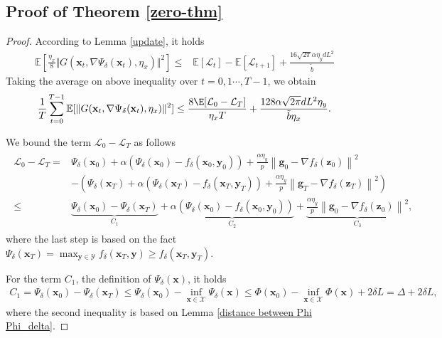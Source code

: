 \documentclass[11pt]{article}
\def\vx{\mathbf{x}}
\def\vy{\mathbf{y}}
\def\fX{{\mathcal{X}}}
\def\BE{{\mathbb{E}}}
\newcommand{\norm}[1]{\left\| #1 \right\|}
\begin{document}
\subsection{Proof of Theorem \ref{zero-thm}}
\begin{proof}
According to Lemma \ref{update}, it holds
\begin{align*}
\BE \left[ \frac{\eta_x}{8} \Vert G(\vx_t,\nabla\Psi_\delta(\vx_t),\eta_x)  \Vert^2   \right]
\le & \BE \left[ \mathcal{L}_t \right]-\BE[\mathcal{L}_{t+1}]  +  \frac{16\sqrt{2\pi }\alpha \eta_y dL^{2}}{\tilde{b}}
\end{align*}  
Taking the average on above inequality over $t = 0,1\cdots,T-1$, we obtain
\begin{align} \label{ieq:res-bound}
\frac{1}{T} \sum_{t=0}^{T-1} \BE[\Vert G(\vx_t,\nabla\Psi_\delta(\vx_t),\eta_x)  \Vert^2] \leq \frac{8\E[\mathcal{L}_0-\mathcal{L}_T] }{\eta_x T}  +
  \frac{128\alpha\sqrt{2\pi }dL^{2}\eta_y}{\tilde{b}\eta_x}.
\end{align}

We bound the term $\mathcal{L}_0-\mathcal{L}_T$ as follows
\begin{align}\label{L0-LT}
\begin{split}
\mathcal{L}_0-\mathcal{L}_T 
= & \Psi_{\delta}(\vx_0) + \alpha \left( \Psi_{\delta}(\vx_{0}) - f_{\delta}(\vx_{0}, \vy_{0}) \right)+\frac{\alpha\eta_y}{p}\norm{\mathbf{g}_0-\nabla f_\delta(\mathbf{z}_0)}^2 \\
& -\left(\Psi_{\delta}(\vx_T) + \alpha \left( \Psi_{\delta}(\vx_{T}) - f_{\delta}(\vx_{T}, \vy_{T}) \right)+\frac{\alpha\eta_y}{p}\norm{\mathbf{g}_T-\nabla f_\delta(\mathbf{z}_T)}^2\right) \\
\leq & 
\underbrace{\Psi_{\delta}(\vx_0) - \Psi_{\delta}(\vx_T)}_{C_1} + 
\underbrace{\alpha \left( \Psi_{\delta}(\vx_{0}) - f_{\delta}(\vx_{0}, \vy_{0}) \right)}_{C_2}+
\underbrace{\frac{\alpha\eta_y}{p}\norm{\mathbf{g}_0-\nabla f_\delta(\mathbf{z}_0)}^2}_{C_3},
\end{split}
\end{align}
where the last step is based on the fact $\Psi_\delta(\vx_T) = \max_{\vy \in \mathcal{Y}} f_\delta(\vx_T, \vy) \geq f_\delta(\vx_T, \vy_T)$.

For the term $C_1$, the definition of $\Psi_\delta(\vx)$, it holds
\begin{align}\label{C1}
\!C_1=\Psi_\delta(\vx_0)-\Psi_\delta(\vx_T)\le\Psi_\delta(\vx_0)-\inf _{\vx\in\fX} \Psi_\delta(\vx)\le \Phi(\vx_0)-\inf_{\vx\in\fX} \Phi(\vx)+2\delta L=\Delta+2\delta L,
\end{align}
where the second inequality is based on Lemma \ref{distance between Phi Phi_delta}.


\end{proof}
\end{document}
